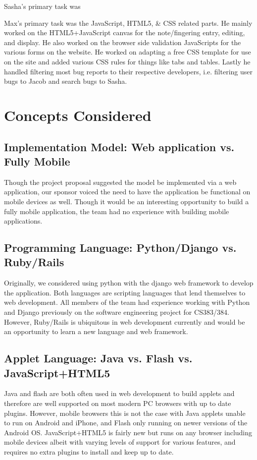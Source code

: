 \documentclass[12pt,english]{article}
\begin{document}
Sasha's primary task was

Max's primary task was the JavaScript, HTML5, \& CSS related parts. He mainly worked on the HTML5+JavaScript
canvas for the note/fingering entry, editing, and display. He also worked on the browser side validation JavaScripts for
the various forms on the website. He worked on adapting a free CSS template for use on the site and added various CSS
rules for things like tabs and tables. Lastly he handled filtering most bug reports to their respective developers, i.e. filtering user
bugs to Jacob and search bugs to Sasha.

\section{Concepts Considered}
\subsection{Implementation Model: Web application vs. Fully Mobile}
Though the project proposal suggested the model be implemented via
a web application, our sponsor voiced the need to have the application
be functional on mobile devices as well. Though it would be an interesting
opportunity to build a fully mobile application, the team had no experience
with building mobile applications.

\subsection{Programming Language: Python/Django vs. Ruby/Rails}
Originally, we considered using python with the django web framework
to develop the application. Both languages are scripting languages
that lend themselves to web development. All members of the team had
experience working with Python and Django previously on the software
engineering project for CS383/384. However, Ruby/Rails is ubiquitous
in web development currently and would be an opportunity to learn
a new language and web framework.

\subsection{Applet Language: Java vs. Flash vs. JavaScript+HTML5}
Java and flash are both often used in web development to build applets and therefore are
well supported on most modern PC browsers with up to date plugins. However, mobile browsers 
this is not the case with Java applets unable to run on Android and iPhone, and Flash only running 
on newer versions of the Android OS. JavaScript+HTML5 is fairly new but runs on any browser including
mobile devices albeit with varying levels of support for various features, and requires no extra plugins
to install and keep up to date.
\end{document}
